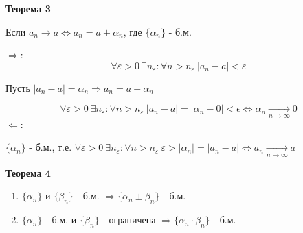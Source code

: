\documentclass[12pt, paper]{article}
\newcommand{\eps}{\varepsilon}
\begin{document}
\begin{tcolorbox}
\textbf{Теорема 3} 
\begin{center}
    Если $a_n \rightarrow a \Leftrightarrow a_n = a + \alpha_n$, где $ \{\alpha_n\}$ - б.м.
\end{center}
\end{tcolorbox}

\begin{tcolorbox}[title=Доказательство Т3]
$\Rightarrow$:\\
\[ \forall \eps>0\ \exists n_\eps : \forall n > n_\eps\ |a_n - a| < \eps \]
\begin{center}
    Пусть $ |a_n-a| = \alpha_n \Rightarrow a_n = a + \alpha_n $    
\end{center}
\[ \forall \eps > 0\ \exists n_\eps: \forall n > n_\eps\  |a_n -a| = |\alpha_n - 0| < \epsilon \Leftrightarrow \alpha_n \xrightarrow[n\rightarrow \infty]{} 0 \]
$\Leftarrow$:\\
\begin{center}
    $ \{\alpha_n \} $ - б.м., т.е. $ \forall \eps>0\ \exists n_\eps : \forall n > n_\eps\ \eps > |\alpha_n| = |a_n-a| \Leftrightarrow a_n \xrightarrow[n \rightarrow \infty]{} a$    
\end{center}
\end{tcolorbox}

\begin{tcolorbox}
\textbf{Теорема 4}
\begin{enumerate}
    \item $\{\alpha_n\}$ и $\{\beta_n\}$ - б.м. $\Rightarrow \{\alpha_n \pm \beta_n\}$ - б.м.
    \item $\{\alpha_n\}$ - б.м. и $\{\beta_n\}$ - ограничена $\Rightarrow \{\alpha_n \cdot \beta_n\}$ - б.м.
\end{enumerate}
\end{tcolorbox}
\end{document}
